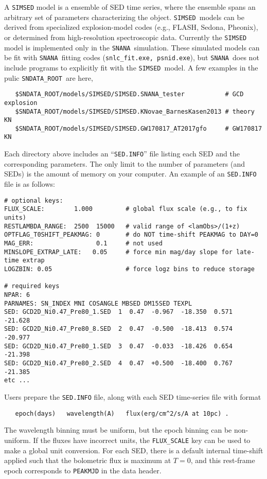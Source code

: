 \documentclass[12pt]{article}
\newcommand{\SIMSED}{{\tt SIMSED}}
\newcommand{\snana}{{\tt SNANA}}
\newcommand{\sndataroot}{{\tt SNDATA\_ROOT}}
\begin{document}
A {\SIMSED} model is a ensemble of SED time series, 
where the ensemble spans an arbitrary set of parameters
characterizing the object.
\SIMSED\ models can be derived from specialized explosion-model 
codes (e.g., FLASH, Sedona, Pheonix),
or determined from high-resolution spectroscopic data.
Currently the {\SIMSED} model is implemented only in the \snana\
simulation. These simulated models can be fit with \snana\
fitting codes ({\tt snlc\_fit.exe, psnid.exe}), but \snana\
does not include programs to explicitly fit with the \SIMSED\ model.
A few examples in the pulic \sndataroot\ are here,
%
\begin{verbatim}
   $SNDATA_ROOT/models/SIMSED/SIMSED.SNANA_tester           # GCD explosion
   $SNDATA_ROOT/models/SIMSED/SIMSED.KNovae_BarnesKasen2013 # theory KN
   $SNDATA_ROOT/models/SIMSED/SIMSED.GW170817_AT2017gfo     # GW170817 KN
\end{verbatim}
%
Each directory above includes an ``{\tt SED.INFO}'' file listing
each SED and the corresponding parameters.
The only limit to the number of parameters (and SEDs)
is the amount of memory on your computer. 
An example of an {\tt SED.INFO} file is as follows:
\begin{Verbatim}[frame=single]
# optional keys:
FLUX_SCALE:        1.000         # global flux scale (e.g., to fix units)
RESTLAMBDA_RANGE:  2500  15000   # valid range of <lamObs>/(1+z)
OPTFLAG_T0SHIFT_PEAKMAG: 0       # do NOT time-shift PEAKMAG to DAY=0
MAG_ERR:                 0.1     # not used
MINSLOPE_EXTRAP_LATE:   0.05     # force min mag/day slope for late-time extrap
LOGZBIN: 0.05                    # force logz bins to reduce storage

# required keys
NPAR: 6
PARNAMES: SN_INDEX MNI COSANGLE MBSED DM15SED TEXPL
SED: GCD2D_Ni0.47_Pre80_1.SED  1  0.47  -0.967  -18.350  0.571  -21.628
SED: GCD2D_Ni0.47_Pre80_8.SED  2  0.47  -0.500  -18.413  0.574  -20.977
SED: GCD2D_Ni0.47_Pre80_1.SED  3  0.47  -0.033  -18.426  0.654  -21.398
SED: GCD2D_Ni0.47_Pre80_2.SED  4  0.47  +0.500  -18.400  0.767  -21.385
etc ...
\end{Verbatim}
Users prepare the {\tt SED.INFO} file, along with each
SED time-series file with format
\begin{verbatim}
   epoch(days)   wavelength(A)   flux(erg/cm^2/s/A at 10pc) .
\end{verbatim}
The wavelength binning must be uniform, but the epoch binning
can be non-uniform.
If the fluxes have incorrect units, the {\tt FLUX\_SCALE} key
can be used to make a global unit conversion. 
For each SED, there is a default internal time-shift 
applied such that the bolometric flux is maximum at $T=0$,
and this rest-frame epoch corresponds to {\tt PEAKMJD} in the data header.
\end{document}
